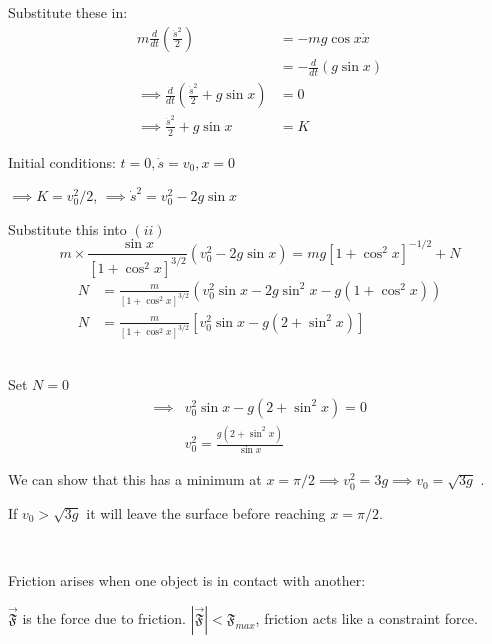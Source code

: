 \documentclass[twoside]{scrartcl}
\renewcommand{\F}{\mathfrak{F}}
\begin{document}
\begin{example}
Substitute these in: 
\[
\begin{aligned}
  m\frac{d}{dt}\left(\frac{\dot{s}^2}{2}\right) &= -mg\cos x \dot{x}\\
  &= -\frac{d}{dt}(g\sin x)\\
  \implies \frac{d}{dt}\left(\frac{\dot{s}^2}{2} + g\sin x\right) &= 0\\
  \implies \frac{\dot{s}^2}{2} + g\sin x &= K
\end{aligned}
\]

Initial conditions: $t = 0, \dot{s} = v_0, x = 0$

$\implies K = v_0^2/2$, $\implies \dot{s}^2 = v_0^2 - 2g\sin x$

Substitute this into $(ii)$
\[
  m \times \frac{\sin x}{[1 + \cos^2x]^{3/2}}(v_0^2 - 2g\sin x) =
  mg[1+\cos^2x]^{-1/2} + N
\]
\[
\begin{aligned}
  N &= \frac{m}{[1+\cos^2x]^{3/2}}(v_0^2\sin x -2g\sin^2x - g(1 + \cos^2x))\\
  N &= \frac{m}{[1+\cos^2x]^{3/2}}[v_0^2\sin x - g(2 + \sin^2x)]
  \end{aligned}
\]~

Set $N = 0$
\[
\begin{aligned}
  \implies &v_0^2\sin x - g(2 + \sin^2x) = 0\\
  &v_0^2 = \frac{g(2 + \sin^2x)}{\sin x}
\end{aligned}
\]

We can show that this has a minimum at $x = \pi/2 \implies v_0^2 = 3g \implies v_0 = \sqrt{3g}$ .

If $v_0 > \sqrt{3g}$ it will leave the surface before reaching $x = \pi/2$. 
\end{example}~

  Friction arises   when one object is in contact with another: 
  
  \begin{center}
  \end{center}
 

$\vec{\F}$ is the force due to friction. $|\vec{\F}| < \F_{max}$, friction acts like a constraint force. 
\end{document}

